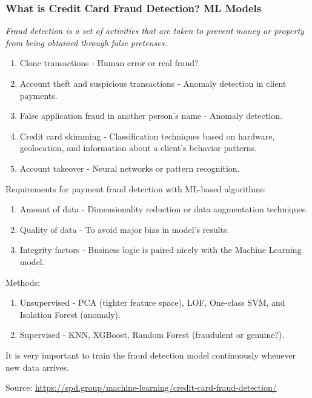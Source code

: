 \documentclass[11pt]{beamer}
\begin{document}
\begin{frame}[fragile]
  \frametitle{\normalsize{\textbf{
    What is Credit Card Fraud Detection? ML Models   
  }}} 

  \scriptsize{  

    \textbullet \: \textit{Fraud detection is a set of activities that are 
    taken to prevent money or property from being obtained through false 
    pretenses.}

    \begin{enumerate}
    \item Clone transactions - Human error or real fraud?
    \item Account theft and suspicious transactions - Anomaly detection in client payments.
    \item False application fraud in another person’s name - Anomaly detection.
    \item Credit card skimming - Classification techniques based on hardware, 
    geolocation, and information about a client’s behavior patterns.
    \item Account takeover - Neural networks or pattern recognition.
    \end{enumerate}

    \textbullet \: Requirements for payment fraud detection with ML-based algorithms:

    \begin{enumerate}
    \item Amount of data - Dimensionality reduction or data augmentation techniques.
    \item Quality of data - To avoid major bias in model's results.
    \item Integrity factors - Business logic is paired nicely with the Machine Learning model. 
    \end{enumerate}

    \textbullet \: Methods:
    
    \begin{enumerate}
    \item Unsupervised - PCA (tighter feature space), LOF, One-class SVM, and
    Isolation Forest (anomaly).
    \item Supervised - KNN, XGBoost, Random Forest (fraudulent or genuine?). 
    \end{enumerate}

    \textbullet \: It is very important to train the fraud detection model 
    continuously whenever new data arrives.

    Source: \url{https://spd.group/machine-learning/credit-card-fraud-detection/}
  }
\end{frame}
\end{document}
